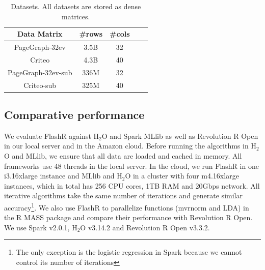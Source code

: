 \begin{table}
\begin{center}
\caption{Datasets. All datasets are stored as dense matrices.}
\vspace{-10pt}
\footnotesize
\begin{tabular}{|c|c|c|c|c|}
\hline
Data Matrix & \#rows & \#cols \\
\hline
PageGraph-32ev \cite{webgraph} & 3.5B & 32 \\
\hline
Criteo \cite{criteo} & 4.3B & 40 \\
\hline
PageGraph-32ev-sub \cite{webgraph} & 336M & 32 \\
\hline
Criteo-sub \cite{criteo} & 325M & 40 \\
\hline
\end{tabular}
\normalsize
\label{tbl:data}
\end{center}
\vspace{-10pt}
\end{table}

\subsection{Comparative performance}
We evaluate FlashR against H$_2$O \cite{h2o} and Spark MLlib \cite{mllib} as well
as Revolution R Open \cite{rro} in our local server and in the Amazon cloud.
Before running the algorithms in H$_2$O and MLlib, we ensure that all data are
loaded and cached in memory. All frameworks use 48 threads in the local server.
In the cloud, we run FlashR in one i3.16xlarge instance
and MLlib and H$_2$O in a cluster with four m4.16xlarge instances,
which in total has 256 CPU cores, 1TB RAM and 20Gbps network.
All iterative algorithms take the same number of iterations and generate
similar accuracy\footnote{The only exception is the logistic regression in Spark
because we cannot control its number of iterations}.
We also use FlashR to parallelize functions (mvrnorm and LDA)
in the R MASS package and compare their performance with Revolution R Open. We use
Spark v2.0.1, H$_2$O v3.14.2 and Revolution R Open v3.3.2.

